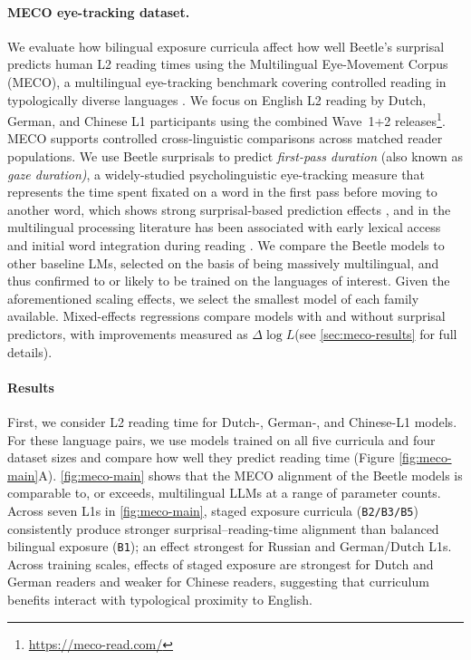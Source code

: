 \documentclass[11pt]{article}
\newcommand{\beetle}{Beetle} %
\begin{document}
\paragraph{MECO eye-tracking dataset.}
We evaluate how bilingual exposure curricula affect how well \beetle's surprisal predicts human L2 reading times using the Multilingual Eye-Movement Corpus (MECO), a multilingual eye-tracking benchmark covering controlled reading in typologically diverse languages \citep{siegelman2022expanding,siegelman2025wave,kuperman2023text,kuperman2025new}. We focus on English L2 reading by Dutch, German, and Chinese L1 participants using the combined Wave~1+2 releases\footnote{\url{https://meco-read.com/}}. MECO supports controlled cross-linguistic comparisons across matched reader populations. We use \beetle{} surprisals to predict \textit{first-pass duration} (also known as\textit{ gaze duration)}, a widely-studied psycholinguistic eye-tracking measure that represents the time spent fixated on a word in the first pass before moving to another word, which shows strong surprisal-based prediction effects \citep[e.g.,][]{wilcox2020predictive}, and in the multilingual processing literature has been associated with early lexical access and initial word integration during reading \citep{dussias2010uses,luke2023exgaussian, nahatame2025relative}. We compare the \beetle{} models to other baseline LMs, selected on the basis of being massively multilingual, and thus confirmed to or likely to be trained on the languages of interest. Given the aforementioned scaling effects, we select the smallest model of each family available. Mixed-effects regressions compare models with and without surprisal predictors, with improvements measured as $\Delta \log L$(see \autoref{sec:meco-results} for full details). 


\paragraph{Results} First, we consider L2 reading time for Dutch-, German-, and Chinese-L1 models. For these language pairs, we use models trained on all five curricula and four dataset sizes and compare how well they predict reading time (Figure \ref{fig:meco-main}A). %
\autoref{fig:meco-main} shows that%
the MECO alignment of the \beetle{} models is comparable to, or exceeds, multilingual LLMs at a range of parameter counts. Across seven L1s in \autoref{fig:meco-main}, staged exposure curricula (\texttt{B2/B3/B5}) consistently produce stronger surprisal--reading-time alignment than balanced bilingual exposure (\texttt{B1}); an effect strongest for Russian and German/Dutch L1s. Across training scales, effects of staged exposure are strongest for Dutch and German readers and weaker for Chinese readers, suggesting that curriculum benefits interact with typological proximity to English. 
\end{document}

